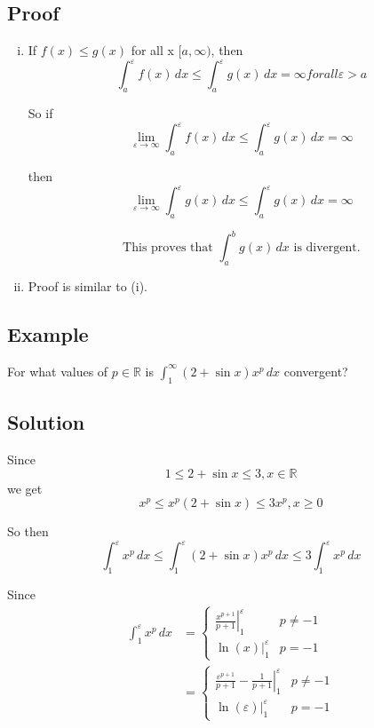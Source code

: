 \documentclass[11pt]{article}
\newcommand{\reals}{\mathbb{R}}
\begin{document}
\subsection*{Proof}
\begin{enumerate}[(i)]
\item If $f(x) \leq g(x)$ for all x $[a, \infty)$, then
\[ \int_a^\varepsilon f(x) \,dx \leq \int_a^\varepsilon g(x) \,dx = \infty for all \varepsilon > a \]

So if
\[ \lim_{\varepsilon \rightarrow \infty} \int_a^\varepsilon f(x) \,dx \leq \int_a^\varepsilon g(x) \,dx = \infty \]

then
\[ \lim_{\varepsilon \rightarrow \infty} \int_a^\varepsilon g(x) \,dx \leq \int_a^\varepsilon g(x) \,dx = \infty \]

\[ \text{This proves that } \int_a^b g(x) \,dx \text{ is divergent.} \]

\item Proof is similar to (i).

\end{enumerate}

\subsection*{Example}
For what values of $p \in \reals$ is $\int_1^\infty (2 + \sin x) x^p \,dx$ convergent?

\subsection*{Solution}
Since
\[ 1 \leq 2 + \sin x \leq 3, x \in \reals \]
we get
\[ x^p \leq x^p (2 + \sin x) \leq 3x^p, x \geq 0 \]

So then
\begin{equation} \label{inequality}
\int_1^\varepsilon x^p \,dx \leq \int_1^\varepsilon (2+ \sin x) x^p \, dx \leq 3 \int_1^\varepsilon x^p \,dx
\end{equation}

Since
\begin{align*}
\int_1^\varepsilon x^p \,dx &= 
\begin{cases}
	\left. \frac{x^{p+1}}{p+1} \right|_1^\varepsilon & p \neq -1\\ 
	\ln(x)|_1^\varepsilon & p = -1
\end{cases} \\
&=
\begin{cases}
	\left. \frac{\varepsilon^{p+1}}{p+1} - \frac{1}{p+1} \right|_1^\varepsilon & p \neq -1\\ 
	\ln(\varepsilon)|_1^\varepsilon & p = -1
\end{cases}
\end{align*}
\end{document}
